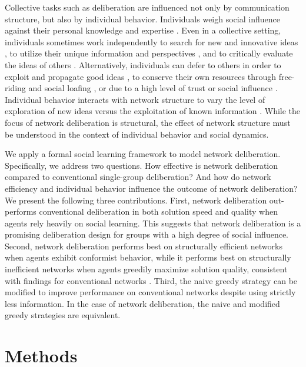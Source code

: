 Collective tasks such as deliberation are influenced not only by communication structure, but also by individual behavior. Individuals weigh social influence against their personal knowledge and expertise  \cite{boyd_culture_1988}. 
Even in a collective setting, individuals sometimes work independently to search for new and innovative ideas \cite{lazer_network_2007, barkoczi_social_2016}, to utilize their unique information and perspectives \cite{hong_interpreted_2009}, and to critically evaluate the ideas of others \cite{rendell_rogersparadox_2010}.
Alternatively, individuals can defer to others in order to exploit and propagate good ideas \cite{barkoczi_social_2016, boyd_culture_1988}, to conserve their own resources through free-riding and social loafing \cite{karau_social_1993}, or due to a high level of trust \cite{salehi_hive_2018} or social influence \cite{banerjee_simple_1992, smith_pathological_2000}. Individual behavior interacts with network structure to vary the level of exploration of new ideas versus the exploitation of known information \cite{barkoczi_social_2016}. While the focus of network deliberation is structural, the effect of network structure must be understood in the context of individual behavior and social dynamics.

We apply a formal social learning framework to model network deliberation.
Specifically, we address two questions. How effective is network deliberation compared to conventional single-group deliberation? And how do network efficiency and individual behavior influence the outcome of network deliberation?
We present the following three contributions.
First, network deliberation out-performs conventional deliberation in both solution speed and quality when agents rely heavily on social learning. This suggests that network deliberation is a promising deliberation design for groups with a high degree of social influence. Second, network deliberation performs best on structurally efficient networks when agents exhibit conformist behavior, while it performs best on structurally inefficient networks when agents greedily maximize solution quality, consistent with findings for conventional networks \cite{barkoczi_social_2016}.
Third, the naive greedy strategy can be modified to improve performance on conventional networks despite using strictly less information. In the case of network deliberation, the naive and modified greedy strategies are equivalent.

\section{Methods}

